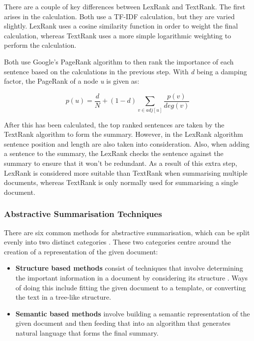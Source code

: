 \documentclass[12pt]{article}
\begin{document}
There are a couple of key differences between LexRank and TextRank. The first arises in the calculation. Both use a TF-IDF calculation, but they are varied slightly. LexRank uses a cosine similarity function in order to weight the final calculation, whereas TextRank uses a more simple logarithmic weighting to perform the calculation. 

Both use Google's PageRank algorithm to then rank the importance of each sentence based on the calculations in the previous step. With \emph{d} being a damping factor, the PageRank of a node \emph{u} is given as:

\[p(u) = \frac{d}{N} + (1-d)\sum_{v \in adj[u]}\frac{p(v)}{deg(v)} \] 

After this has been calculated, the top ranked sentences are taken by the TextRank algorithm to form the summary. However, in the LexRank algorithm sentence position and length are also taken into consideration. Also, when adding a sentence to the summary, the LexRank checks the sentence against the summary to ensure that it won't be redundant. As a result of this extra step, LexRank is considered more suitable than TextRank when summarising multiple documents, whereas TextRank is only normally used for summarising a single document.

\subsubsection{Abstractive Summarisation Techniques}

\label{abstractiveSummarisation}

There are six common methods for abstractive summarisation, which can be split evenly into two distinct categories \cite{abstractiveTechniques}. These two categories centre around the creation of a representation of the given document: \\

\begin{itemize}
	\item \textbf{Structure based methods} consist of techniques that involve determining the important information in a document by considering its structure \cite{abstractiveTechniquesOriginal}. Ways of doing this include fitting the given document to a template, or converting the text in a tree-like structure. 
	\item \textbf{Semantic based methods} involve building a semantic representation of the given document and then feeding that into an algorithm that generates natural language that forms the final summary. \\
\end{itemize}
\end{document}
